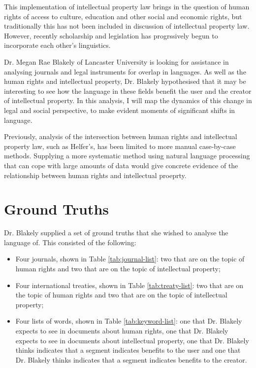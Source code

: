 		This implementation of intellectual property law brings in the question of human rights of access to culture, education and other social and economic rights, but traditionally this has not been included in discussion of intellectual property law. However, recently scholarship and legislation has progrssively begun to incorporate each other's linguistics\cite{mapping_ip_hr_helfer}.
			
		Dr. Megan Rae Blakely of Lancaster University is looking for assistance in analysing journals and legal instruments for overlap in languages. As well as the human rights and intellectual property, Dr. Blakely hypothesised that it may be interesting to see how the language in these fields benefit the user and the creator of intellectual property\cite{bileta_proposal_blakely}. In this analysis, I will map the dynamics of this change in legal and social perspective, to make evident moments of significant shifts in language. 
			
		Previously, analysis of the intersection between human rights and intellectual property law, such as Helfer's\cite{hr_ip_conflict_coexistence_helfer}, has been limited to more manual case-by-case methods. Supplying a more systematic method using natural language processing that can cope with large amounts of data would give concrete evidence of the relationship between human rights and intellectual proeprty. 
	\section{Ground Truths}
		Dr. Blakely supplied a set of ground truths that she wished to analyse the language of. This consisted of the following:
		\begin{itemize}
			\item Four journals, shown in Table \ref{tab:journal-list}: two that are on the topic of human rights and two that are on the topic of intellectual property;
			\item Four international treaties, shown in Table \ref{tab:treaty-list}: two that are on the topic of human rights and two that are on the topic of intellectual property;
			\item Four lists of words, shown in Table \ref{tab:keyword-list}: one that Dr. Blakely expects to see in documents about human rights, one that Dr. Blakely expects to see in documents about intellectual property, one that Dr. Blakely thinks indicates that a segment indicates benefits to the user and one that Dr. Blakely thinks indicates that a segment indicates benefits to the creator.
		\end{itemize} 
